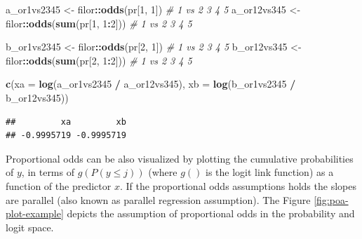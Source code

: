 \documentclass[
  man,floatsintext]{apa6}
\newenvironment{Shaded}{\begin{snugshade}}{\end{snugshade}}
\newcommand{\AttributeTok}[1]{\textcolor[rgb]{0.13,0.29,0.53}{#1}}
\newcommand{\CommentTok}[1]{\textcolor[rgb]{0.56,0.35,0.01}{\textit{#1}}}
\newcommand{\DecValTok}[1]{\textcolor[rgb]{0.00,0.00,0.81}{#1}}
\newcommand{\FunctionTok}[1]{\textcolor[rgb]{0.13,0.29,0.53}{\textbf{#1}}}
\newcommand{\NormalTok}[1]{#1}
\newcommand{\OtherTok}[1]{\textcolor[rgb]{0.56,0.35,0.01}{#1}}
\newcommand{\SpecialCharTok}[1]{\textcolor[rgb]{0.81,0.36,0.00}{\textbf{#1}}}
\begin{document}
\scriptsize

\begin{Shaded}
\begin{Highlighting}[]
\NormalTok{a\_or1vs2345 }\OtherTok{\textless{}{-}}\NormalTok{ filor}\SpecialCharTok{::}\FunctionTok{odds}\NormalTok{(pr[}\DecValTok{1}\NormalTok{, }\DecValTok{1}\NormalTok{]) }\CommentTok{\# 1 vs 2 3 4 5}
\NormalTok{a\_or12vs345 }\OtherTok{\textless{}{-}}\NormalTok{ filor}\SpecialCharTok{::}\FunctionTok{odds}\NormalTok{(}\FunctionTok{sum}\NormalTok{(pr[}\DecValTok{1}\NormalTok{, }\DecValTok{1}\SpecialCharTok{:}\DecValTok{2}\NormalTok{])) }\CommentTok{\# 1 vs 2 3 4 5}

\NormalTok{b\_or1vs2345 }\OtherTok{\textless{}{-}}\NormalTok{ filor}\SpecialCharTok{::}\FunctionTok{odds}\NormalTok{(pr[}\DecValTok{2}\NormalTok{, }\DecValTok{1}\NormalTok{]) }\CommentTok{\# 1 vs 2 3 4 5}
\NormalTok{b\_or12vs345 }\OtherTok{\textless{}{-}}\NormalTok{ filor}\SpecialCharTok{::}\FunctionTok{odds}\NormalTok{(}\FunctionTok{sum}\NormalTok{(pr[}\DecValTok{2}\NormalTok{, }\DecValTok{1}\SpecialCharTok{:}\DecValTok{2}\NormalTok{])) }\CommentTok{\# 1 vs 2 3 4 5}

\FunctionTok{c}\NormalTok{(}\AttributeTok{xa =} \FunctionTok{log}\NormalTok{(a\_or1vs2345 }\SpecialCharTok{/}\NormalTok{ a\_or12vs345), }\AttributeTok{xb =} \FunctionTok{log}\NormalTok{(b\_or1vs2345 }\SpecialCharTok{/}\NormalTok{ b\_or12vs345))}
\end{Highlighting}
\end{Shaded}

\begin{verbatim}
##         xa         xb 
## -0.9995719 -0.9995719
\end{verbatim}

\normalsize

Proportional odds can be also visualized by plotting the cumulative probabilities of \(y\), in terms of \(g(P(y \leq j))\) (where \(g()\) is the logit link function) as a function of the predictor \(x\). If the proportional odds assumptions holds the slopes are parallel (also known as parallel regression assumption). The Figure \ref{fig:poa-plot-example} depicts the assumption of proportional odds in the probability and logit space.

\scriptsize
\end{document}
